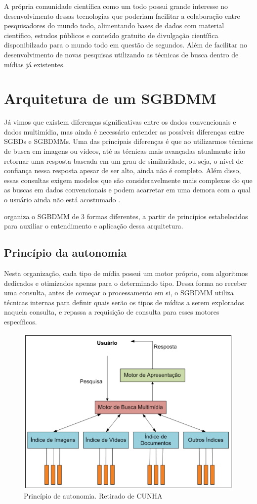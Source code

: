 \documentclass[12pt]{article}
\begin{document}
A própria comunidade científica como um todo possui grande interesse no desenvolvimento dessas tecnologias que poderiam facilitar a colaboração entre pesquisadores do mundo todo, alimentando bases de dados com material científico, estudos públicos e conteúdo gratuito de divulgação científica disponibilzado para o mundo todo em questão de segundos. Além de facilitar no desenvolvimento de novas pesquisas utilizando as técnicas de busca dentro de mídias já existentes.

\section{Arquitetura de um SGBDMM}

Já vimos que existem diferenças significativas entre os dados convencionais e dados multimídia, mas ainda é necessário entender as possíveis diferenças entre SGBDs e SGBDMMs. Uma das principais diferenças é que ao utilizarmos técnicas de busca em imagens ou vídeos, até as técnicas mais avançadas atualmente irão retornar uma resposta baseada em um grau de similaridade, ou seja, o nível de confiança nessa resposta apesar de ser alto, ainda não é completo. Além disso, essas consultas exigem modelos que são consideravelmente mais complexos do que as buscas em dados convencionais e podem acarretar em uma demora com a qual o usuário ainda não está acostumado \cite{bittencourt}.

\cite{biazi} organiza o SGBDMM de 3 formas diferentes, a partir de princípios estabelecidos para auxiliar o entendimento e aplicação dessa arquitetura.

\subsection{Princípio da autonomia}

Nesta organização, cada tipo de mídia possui um motor próprio, com algoritmos dedicados e otimizados apenas para o determinado tipo. Dessa forma ao receber uma consulta, antes de começar o processamento em si, o SGBDMM utiliza técnicas internas para definir quais serão os tipos de mídias a serem explorados naquela consulta, e repassa a requisição de consulta para esses motores específicos.

\begin{figure}[H]
    \centering
    \includegraphics[width=0.7\linewidth]{figure_1.png}
    \caption{Princípio de autonomia. Retirado de CUNHA\cite{cunha}}
\end{figure}
\end{document}
